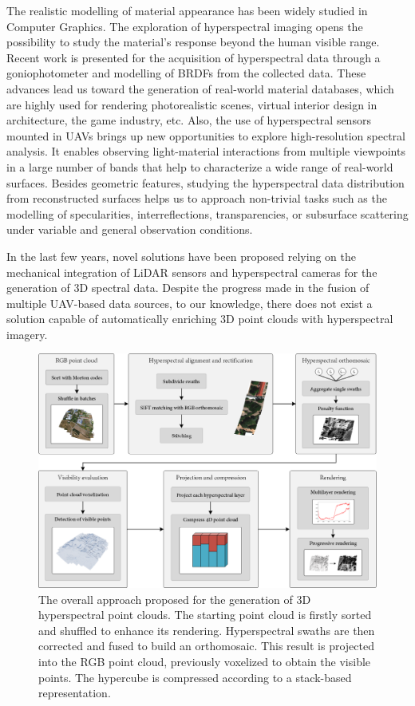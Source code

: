 The realistic modelling of material appearance has been widely studied in Computer Graphics. The exploration of hyperspectral imaging opens the possibility to study the material's response beyond the human visible range. Recent work is presented for the acquisition of hyperspectral data through a goniophotometer and modelling of BRDFs from the collected data. These advances lead us toward the generation of real-world material databases, which are highly used for rendering photorealistic scenes, virtual interior design in architecture, the game industry, etc. Also, the use of hyperspectral sensors mounted in UAVs brings up new opportunities to explore high-resolution spectral analysis. It enables observing light-material interactions from multiple viewpoints in a large number of bands that help to characterize a wide range of real-world surfaces. Besides geometric features, studying the hyperspectral data distribution from reconstructed surfaces helps us to approach non-trivial tasks such as the modelling of specularities, interreflections, transparencies, or subsurface scattering under variable and general observation conditions. 

In the last few years, novel solutions have been proposed relying on the mechanical integration of LiDAR sensors and hyperspectral cameras for the generation of 3D spectral data. Despite the progress made in the fusion of multiple UAV-based data sources, to our knowledge, there does not exist a solution capable of automatically enriching 3D point clouds with hyperspectral imagery. 

\begin{figure}[bt]
    \centering
    \includegraphics[width=\linewidth]{figs/hyper_point_cloud/overview.png}
	\caption{The overall approach proposed for the generation of 3D hyperspectral point clouds. The starting point cloud is firstly sorted and shuffled to enhance its rendering. Hyperspectral swaths are then corrected and fused to build an orthomosaic. This result is projected into the RGB point cloud, previously voxelized to obtain the visible points. The hypercube is compressed according to a stack-based representation. }
	\label{fig:hyper_summary}
\end{figure}

